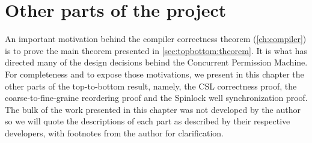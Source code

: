 \chapter{Other parts of the project} \label{ch:otherparts}

An important motivation behind the compiler correctness theorem (\autoref{ch:compiler}) is to prove the main theorem presented in \autoref{sec:topbottom:theorem}. It is what has directed many of the design decisions behind the Concurrent Permission Machine. For completeness and to expose those motivations, we present in this chapter the other parts of the top-to-bottom result, namely, the CSL correctness proof, the coarse-to-fine-graine reordering proof and the Spinlock well synchronization proof.  The bulk of the work presented in this chapter was not developed by the author so we will quote the descriptions of each part as described by their respective developers, with footnotes from the author for clarification. 





